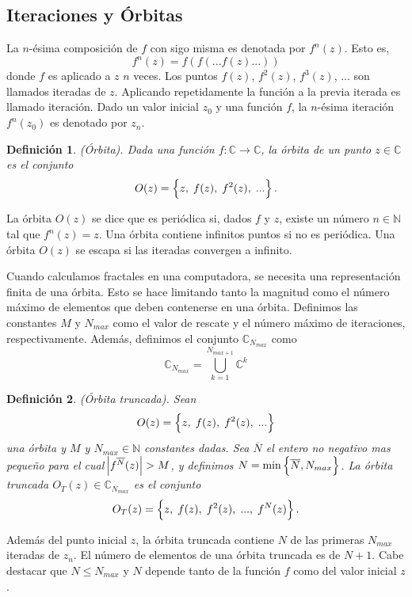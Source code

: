 \documentclass[12pt,letterpaper,final]{article}
\theoremstyle{plain}
\newtheorem{defn}{Definición}[section]
\theoremstyle{definition}
\theoremstyle{remark}
\numberwithin{equation}{section}
\begin{document}
\subsection{Iteraciones y Órbitas}
La $n$-ésima composición de $f$ con sigo misma es denotada por $f^n(z)$. Esto es, \[ f^n(z) = f(f(...f(z)...)) \]
donde $f$ es aplicado a $z$ $n$ veces. Los puntos $f(z)$, $f^2(z)$, $f^3(z)$, ... son llamados iteradas de $z$. Aplicando repetidamente la función a la previa iterada es llamado iteración. Dado un valor inicial $z_0$ y una función $f$, la $n$-ésima iteración $f^n(z_0)$ es denotado por $z_n$.

\begin{defn} \label{defn_Órbita}
(Órbita). Dada una función $f:\mathds{C}\to\mathds{C}$, la órbita de un punto $z\in\mathds{C}$ es el conjunto \[ O(z) = \set{z,\;f(z),\;f^2(z),\;...}. \]
\end{defn}

La órbita $O(z)$ se dice que es periódica si, dados $f$ y $z$, existe un número $n\in\mathds{N}$ tal que $f^n(z) = z$. Una órbita contiene infinitos puntos si no es periódica. Una órbita $O(z)$ se escapa si las iteradas convergen a infinito.

Cuando calculamos fractales en una computadora, se necesita una representación finita de una órbita. Esto se hace limitando tanto la magnitud como el número máximo de elementos que deben contenerse en una órbita. Definimos las constantes $M$ y $N_{max}$ como el valor de rescate y el número máximo de iteraciones, respectivamente. Además, definimos el conjunto $\mathds{C}_{N_{max}}$ como \[ \mathds{C}_{N_{max}} = \bigcup_{k = 1}^{N_{max + 1}} \mathds{C}^k \]

\begin{defn}\label{defn:Órbita truncada}
(Órbita truncada). Sean \[ O(z) = \set{z,\;f(z),\;f^2(z),\;...} \] una órbita y $M$ y $N_{max}\in\mathds{N}$ constantes dadas. Sea $\overline{N}$ el entero no negativo mas pequeño para el cual $\abs{f^{\overline{N}}(z)} > M$, y definimos $N = \min\set{\overline{N}, N_{max}}$. La órbita truncada $O_T(z) \in \mathds{C}_{N_{max}}$ es el conjunto \[ O_T(z) = \set{z,\;f(z),\;f^2(z),\;...,\;f^N(z)}. \]
\end{defn}

Además del punto inicial $z$, la órbita truncada contiene $N$ de las primeras $N_{max}$ iteradas de $z_n$. El número de elementos de una órbita truncada es de $N+1$. Cabe destacar que $N \leq N_{max}$ y $N$ depende tanto de la función $f$ como del valor inicial $z$.
\end{document}
